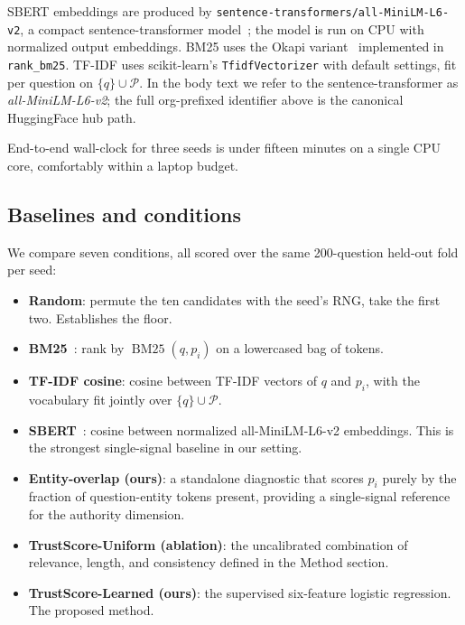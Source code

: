 SBERT embeddings are produced by
\texttt{sentence-transformers/all-MiniLM-L6-v2}, a compact
sentence-transformer model~\cite{reimers2019sbert}; the model is run
on CPU with normalized output embeddings. BM25 uses the Okapi
variant~\cite{robertson2009bm25} implemented in \texttt{rank\_bm25}.
TF-IDF uses scikit-learn's \texttt{TfidfVectorizer} with default
settings, fit per question on $\{q\}\cup\mathcal{P}$. In the body text
we refer to the sentence-transformer as \emph{all-MiniLM-L6-v2}; the
full org-prefixed identifier above is the canonical HuggingFace hub
path.

End-to-end wall-clock for three seeds is under fifteen minutes on a
single CPU core, comfortably within a laptop budget.

\subsection{Baselines and conditions}

We compare seven conditions, all scored over the same 200-question
held-out fold per seed:

\begin{itemize}
  \item \textbf{Random}: permute the ten candidates with the seed's
  RNG, take the first two. Establishes the floor.
  \item \textbf{BM25}~\cite{robertson2009bm25}: rank by
  $\operatorname{BM25}(q, p_i)$ on a lowercased bag of tokens.
  \item \textbf{TF-IDF cosine}: cosine between TF-IDF vectors of $q$
  and $p_i$, with the vocabulary fit jointly over
  $\{q\}\cup\mathcal{P}$.
  \item \textbf{SBERT}~\cite{reimers2019sbert}: cosine between
  normalized all-MiniLM-L6-v2 embeddings. This is the strongest
  single-signal baseline in our setting.
  \item \textbf{Entity-overlap (ours)}: a standalone diagnostic that
  scores $p_i$ purely by the fraction of question-entity tokens
  present, providing a single-signal reference for the authority
  dimension.
  \item \textbf{TrustScore-Uniform (ablation)}: the uncalibrated
  combination of relevance, length, and consistency defined in the
  Method section.
  \item \textbf{TrustScore-Learned (ours)}: the supervised six-feature
  logistic regression. The proposed method.
\end{itemize}

